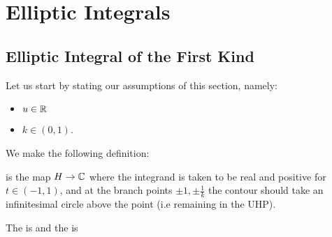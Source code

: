 \documentclass{article}
\begin{document}
\section{Elliptic Integrals}

\subsection{Elliptic Integral of the First Kind}
Let us start by stating our assumptions of this section, namely:
\begin{itemize}
	\item $u \in \mathbb{R}$
	\item $k \in (0,1)$.
\end{itemize}

We make the following definition:

\begin{definition}
	 is the map $H\to \mathbb{C}$
	where the integrand is taken to be real and positive for $t \in (-1,1)$, and at the branch points $\pm 1, \pm \frac{1}{k}$ the contour should take an infinitesimal circle above the point (i.e remaining in the UHP). 
\end{definition}

\begin{definition}
	The  is 
	and the  is 
\end{definition}
\end{document}

